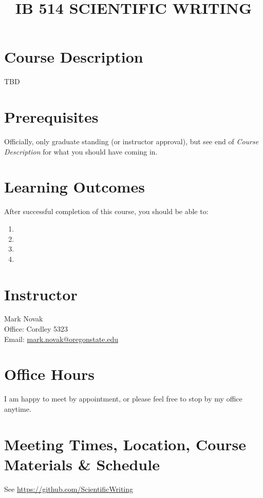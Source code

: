 \documentclass[10pt]{article}
\title{IB 514 SCIENTIFIC WRITING}
\author{}
\date{}
\begin{document}
\maketitle
\vspace{-50pt}


\section*{Course Description}
	TBD

\section*{Prerequisites}
\noindent
	Officially, only graduate standing (or instructor approval), but see end of 
	\emph{Course Description} for what you should have coming in.

\section*{Learning Outcomes}
\noindent
After successful completion of this course, you should be able to:
\begin{enumerate}
	\itemsep0em
	\item 
	\item 
	\item 
	\item 
\end{enumerate}

\section*{Instructor}
	\noindent
	Mark Novak\\
	Office: Cordley 5323\\
	Email: \href{mailto:mark.novak@oregonstate.edu}{mark.novak@oregonstate.edu}\\


\section*{Office Hours}
\noindent
	I am happy to meet by appointment, or please feel free to stop by my office 
	anytime.

\section*{Meeting Times, Location, Course Materials \& Schedule}
\noindent
See
\href{https://github.com/ScientificWriting}{https://github.com/ScientificWriting}
 
\end{document}
